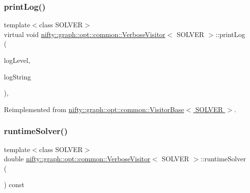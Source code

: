 \subsubsection{\texorpdfstring{print\+Log()}{printLog()}}
{\footnotesize\ttfamily template$<$class S\+O\+L\+V\+ER$>$ \\
virtual void \hyperlink{classnifty_1_1graph_1_1opt_1_1common_1_1VerboseVisitor}{nifty\+::graph\+::opt\+::common\+::\+Verbose\+Visitor}$<$ S\+O\+L\+V\+ER $>$\+::print\+Log (\begin{DoxyParamCaption}\item[{const \hyperlink{namespacenifty_1_1logging_a3385625f9a0dbb17f70c47d3fca2f64d}{nifty\+::logging\+::\+Log\+Level}}]{log\+Level,  }\item[{const std\+::string \&}]{log\+String }\end{DoxyParamCaption})\hspace{0.3cm}{\ttfamily [inline]}, {\ttfamily [virtual]}}



Reimplemented from \hyperlink{classnifty_1_1graph_1_1opt_1_1common_1_1VisitorBase_ad9092d8387ff327b254df08ef97363a3}{nifty\+::graph\+::opt\+::common\+::\+Visitor\+Base$<$ S\+O\+L\+V\+E\+R $>$}.

\mbox{\label{classnifty_1_1graph_1_1opt_1_1common_1_1VerboseVisitor_ac4d88a68c144e0dd15b47dac8275866e}} 
\subsubsection{\texorpdfstring{runtime\+Solver()}{runtimeSolver()}}
{\footnotesize\ttfamily template$<$class S\+O\+L\+V\+ER$>$ \\
double \hyperlink{classnifty_1_1graph_1_1opt_1_1common_1_1VerboseVisitor}{nifty\+::graph\+::opt\+::common\+::\+Verbose\+Visitor}$<$ S\+O\+L\+V\+ER $>$\+::runtime\+Solver (\begin{DoxyParamCaption}{ }\end{DoxyParamCaption}) const\hspace{0.3cm}{\ttfamily [inline]}}

\mbox{\label{classnifty_1_1graph_1_1opt_1_1common_1_1VerboseVisitor_af51c8a2e3b5b5bd9f873a748bfa99240}} 

